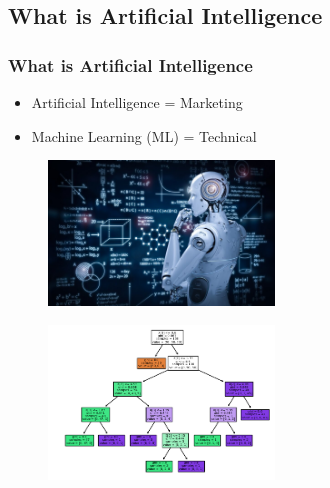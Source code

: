 \subsection{What is Artificial Intelligence}
\begin{frame}\frametitle{What is Artificial Intelligence}
   \begin{itemize}
      \item Artificial Intelligence = Marketing
      \item Machine Learning (ML) = Technical
   \end{itemize}
   \vspace*{20px}
   \begin{minipage}{0.48\linewidth}
      \begin{figure}[H]
         \includegraphics[width=6cm]{../images/illustrations/ai.jpeg}
      \end{figure}
   \end{minipage}
   \begin{minipage}{0.48\linewidth}
      \begin{figure}[H]
         \includegraphics[width=6cm]{../images/illustrations/tree.png}
      \end{figure}
   \end{minipage}
\end{frame}

